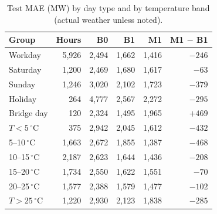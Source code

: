 \begin{table}[H]
  \centering
  \small
  \caption{Test MAE (MW) by day type and by temperature band (actual weather unless noted).}
  \label{tab:test-groups}
  \begin{tabular}{@{}l r r r r r@{}}
    \toprule
    Group & Hours & B0 & B1 & M1 & M1 $-$ B1 \\
    \midrule
    Workday & 5{,}926 & 2{,}494 & 1{,}662 & 1{,}416 & $-246$ \\
    Saturday & 1{,}200 & 2{,}469 & 1{,}680 & 1{,}617 & $-63$ \\
    Sunday & 1{,}246 & 3{,}020 & 2{,}102 & 1{,}723 & $-379$ \\
    Holiday & 264 & 4{,}777 & 2{,}567 & 2{,}272 & $-295$ \\
    Bridge day & 120 & 2{,}324 & 1{,}495 & 1{,}965 & $+469$ \\
    \midrule
    $T<5\,^\circ$C & 375 & 2{,}942 & 2{,}045 & 1{,}612 & $-432$ \\
    5--10\,$^\circ$C & 1{,}663 & 2{,}672 & 1{,}855 & 1{,}387 & $-468$ \\
    10--15\,$^\circ$C & 2{,}187 & 2{,}623 & 1{,}644 & 1{,}436 & $-208$ \\
    15--20\,$^\circ$C & 1{,}734 & 2{,}550 & 1{,}622 & 1{,}551 & $-70$ \\
    20--25\,$^\circ$C & 1{,}577 & 2{,}388 & 1{,}579 & 1{,}477 & $-102$ \\
    $T>25\,^\circ$C & 1{,}220 & 2{,}930 & 2{,}123 & 1{,}838 & $-285$ \\
    \bottomrule
  \end{tabular}
\end{table}

